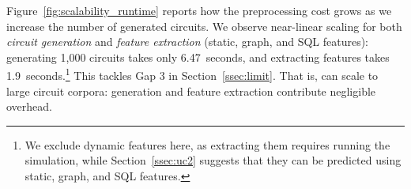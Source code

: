 Figure~\ref{fig:scalability_runtime} reports how the \sys preprocessing cost grows as we increase the number of generated circuits.
We observe near-linear scaling for both \emph{circuit generation} and \emph{feature extraction} (static, graph, and SQL features): generating
1{,}000 circuits takes only 6.47~seconds, and extracting features takes 1.9~seconds.\footnote{We exclude dynamic features here, as extracting them requires running the simulation, while Section~\ref{ssec:uc2} suggests that they can be predicted using static, graph, and SQL features.}
This tackles Gap 3 in Section~\ref{ssec:limit}. That is, \sys can scale to large circuit corpora: generation and feature extraction contribute negligible overhead.

\medskip
  \vspace{0.2cm}
\noindent
\setlength{\fboxsep}{6pt}
%

